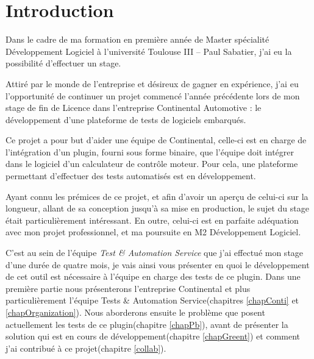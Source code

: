\chapter*{Introduction}


Dans le cadre de ma formation en première année de Master spécialité Développement Logiciel à l'université Toulouse III – Paul Sabatier, j'ai eu la possibilité d'effectuer un stage.


Attiré par le monde de l'entreprise et désireux de gagner en expérience, j'ai eu l'opportunité de continuer un projet commencé l'année précédente lors de mon stage de fin de Licence dans l'entreprise Continental Automotive : le développement d'une plateforme de tests de logiciels embarqués.

Ce projet a pour but d'aider une équipe de Continental, celle-ci est en charge de l'intégration d'un plugin, fourni sous forme binaire, que l'équipe doit intégrer dans le logiciel d'un calculateur de contrôle moteur. Pour cela, une plateforme permettant d'effectuer des tests automatisés est en développement.

Ayant connu les prémices de ce projet, et afin d'avoir un aperçu de celui-ci sur la longueur, allant de sa conception jusqu'à sa mise en production, le sujet du stage était particulièrement intéressant. En outre, celui-ci est en parfaite adéquation avec mon projet professionnel, et ma poursuite en M2 Développement Logiciel.

C'est au sein de l'équipe \textit{Test \& Automation Service} que j'ai effectué mon stage d'une durée de quatre mois, je vais ainsi vous présenter en quoi le développement de cet outil est nécessaire à l'équipe en charge des tests de ce plugin. Dans une première partie nous présenterons l'entreprise Continental et plus particulièrement l'équipe Tests \& Automation Service(chapitres \ref{chapConti} et \ref{chapOrganization}). Nous aborderons ensuite le problème que posent actuellement les tests de ce plugin(chapitre \ref{chapPb}), avant de présenter la solution qui est en cours de développement(chapitre \ref{chapGreent}) et comment j'ai contribué à ce projet(chapitre \ref{collab}). 
